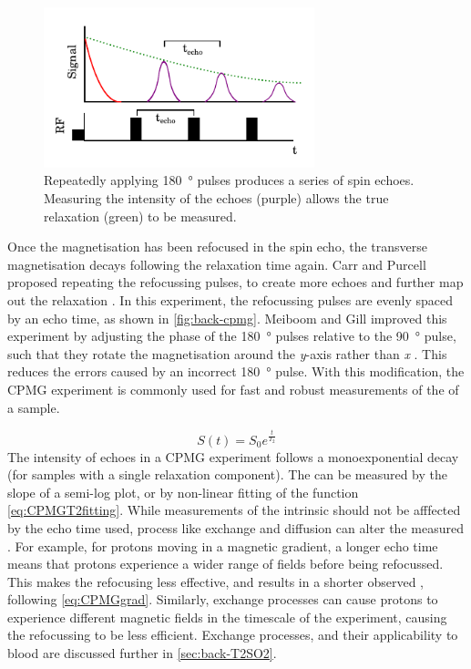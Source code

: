 \begin{figure}[t]
\centering
\includegraphics[width=0.7\textwidth]{figures/background/cpmg.pdf}
\caption[CPMG pulse sequence]{Repeatedly applying \SI{180}{\degree} pulses produces a series of spin echoes. Measuring the intensity of the echoes (purple) allows the true \Ttwo relaxation (green) to be measured.}
\label{fig:back-cpmg}
\end{figure}

Once the magnetisation has been refocused in the spin echo, the transverse magnetisation decays following the \Ttwostar relaxation time again.
Carr and Purcell proposed repeating the refocussing pulses, to create more echoes and further map out the \Ttwo relaxation \cite{CarrEffectsDiffusionFree1954}.
In this experiment, the refocussing pulses are evenly spaced by an echo time, as shown in \autoref{fig:back-cpmg}.
Meiboom and Gill improved this experiment by adjusting the phase of the \SI{180}{\degree} pulses relative to the \SI{90}{\degree} pulse, such that they rotate the magnetisation around the \textit{y}-axis rather than \textit{x} \cite{MeiboomModifiedSpinEcho1958}.
This reduces the errors caused by an incorrect \SI{180}{\degree} pulse.
With this modification, the CPMG experiment is commonly used for fast and robust measurements of the \Ttwo of a sample.

\begin{equation}
S(t) = S_0 e^{\frac{t}{T_2}}
\label{eq:CPMGT2fitting}
\end{equation}
The intensity of echoes in a CPMG experiment follows a monoexponential decay (for samples with a single relaxation component).
The \Ttwo can be measured by the slope of a semi-log plot, or by non-linear fitting of the function \ref{eq:CPMGT2fitting}.
While measurements of the intrinsic \Ttwo should not be afffected by the echo time used, process like exchange and diffusion can alter the measured \Ttwo.
For example, for protons moving in a magnetic gradient, a longer echo time means that protons experience a wider range of \Bzero fields before being refocussed.
This makes the refocusing less effective, and results in a shorter observed \Ttwo, following \autoref{eq:CPMGgrad}.
Similarly, exchange processes can cause protons to experience different magnetic fields in the timescale of the experiment, causing the refocussing to be less efficient.
Exchange processes, and their applicability to blood are discussed further in \autoref{sec:back-T2SO2}.

